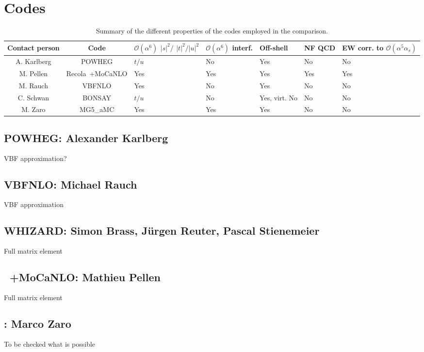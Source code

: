 \documentclass[a4paper,10pt]{report}
\begin{document}
\section{Codes}
\begin{table}
    \footnotesize
    \begin{tabularx}{\textwidth}{c|c|X|X|X|X|X}
        Contact person  &  Code  &  $\mathcal O(\alpha^6)$ $|s|^2/$ $|t|^2/|u|^2$  &  $\mathcal O(\alpha^6)$ interf.  &  Off-shell  &  NF QCD  &  EW corr. to $\mathcal O(\alpha^5\alpha_s)$  \\
        \hline
        \hline
        A. Karlberg  &  {\sc POWHEG}  &  $t/u$  &  No  &  Yes  &  No  &  No  \\
        M. Pellen    &  {\sc Recola}\ +{\sc MoCaNLO}  &  Yes  &  Yes  &  Yes  &  Yes  &  Yes  \\
        M. Rauch     &  {\sc VBFNLO}  &  Yes  &  No  &  Yes  &  No  &  No  \\
        C. Schwan    &  {\sc BONSAY}  &  $t/u$  &  No  &  Yes, virt. No  &  No  &  No  \\
        M. Zaro      &  {\sc MG5\_aMC}  &  Yes  &  Yes  &  Yes  &  No  &  No
    \end{tabularx}
    \caption{\label{tab:codes} Summary of the different properties of the codes employed in the comparison.}
\end{table}

\subsection{ {\sc POWHEG}: Alexander Karlberg}
VBF approximation? \\
\subsection{ {\sc VBFNLO}: Michael Rauch}
VBF approximation \\
\subsection{ {\sc WHIZARD}: Simon Brass, J\"urgen Reuter, Pascal Stienemeier}
Full matrix element \\
\subsection{ \recola\ +{\sc MoCaNLO}: Mathieu Pellen}
Full matrix element \\
\subsection{ \madgraph: Marco Zaro}
To be checked what is possible \\
\end{document}
